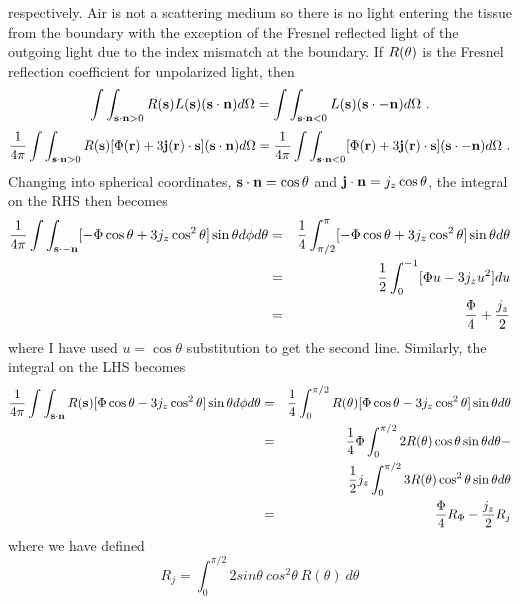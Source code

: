 respectively. Air is not a scattering medium so there is no light entering the tissue from the boundary with the exception of the Fresnel reflected light of the outgoing light due to the index mismatch at the boundary. If $R({\bf \theta})$ is the Fresnel reflection coefficient for unpolarized light, then
\begin{equation}
\label{bc1}
\int\int_{{\bf s} \cdot {\bf n} > 0} R({\bf s}) L({\bf s}) ({\bf s} \cdot {\bf n}) d\Omega =
\int\int_{{\bf s} \cdot {\bf n} < 0} L({\bf s}) ({\bf s} \cdot {- \bf
  n}) d\Omega \ .
\end{equation}
\begin{equation}
\label{bc2}
\frac{1}{4\pi}\int\int_{{\bf s} \cdot {\bf n} > 0} R({\bf s}) [ \Phi({\bf
  r}) + 3 {\bf j}({\bf r}) \cdot {\bf s}] ({\bf s} \cdot {\bf n})
d\Omega = \frac{1}{4\pi} \int\int_{{\bf s} \cdot {\bf n} < 0} [ \Phi({\bf r}) + 3 {\bf j}({\bf
  r}) \cdot {\bf s}] ({\bf s} \cdot {-\bf n}) d\Omega \ .
\end{equation}
Changing into spherical coordinates, ${\bf s}\cdot{\bf
  n}=\cos\theta$ and ${\bf j}\cdot{\bf n}=j_z\cos\theta$, the integral
on the RHS then becomes
\begin{eqnarray}
\label{bc3}
\frac{1}{4\pi}\int\int_{{\bf s} \cdot {-\bf n}} [-\Phi\cos\theta +
3j_z\cos^2\theta]\sin\theta d \phi d\theta &=&
\frac{1}{4}\int_{\pi/2}^{\pi} [-\Phi\cos\theta +
3j_z\cos^2\theta]\sin\theta d\theta \nonumber\\ 
&=&\frac{1}{2}\int_{0}^{-1} [\Phi u - 3j_zu^2] du \nonumber \\
&=&\frac{\Phi}{4}+\frac{j_z}{2}
\end{eqnarray}
\noindent
where I have used $u=\cos\theta$ substitution to get the second line. Similarly, the integral on the LHS becomes 
\begin{eqnarray}
\label{bc4}
\frac{1}{4\pi}\int\int_{{\bf s} \cdot {\bf n}} R({\bf s})[\Phi\cos\theta -
3j_z\cos^2\theta]\sin\theta d \phi d\theta &=&  \frac{1}{4}\int_{0}^{\pi/2}
 R({\bf \theta})[\Phi\cos\theta - 3j_z\cos^2\theta]\sin\theta d\theta \nonumber\\
&=& \frac{1}{4}\Phi\int_{0}^{\pi/2}2R({\bf \theta})\cos\theta\sin\theta
d\theta - \nonumber \\
& & \frac{1}{2} j_z\int_{0}^{\pi/2}3R({\bf \theta})\cos^2\theta\sin\theta d\theta \nonumber \\
&=&\frac{\Phi}{4}R_\Phi-\frac{j_z}{2}R_j
\end{eqnarray}
\noindent
where we have defined
\begin{equation}
\label{Rj}
R_j = \int_0^{\pi/2} 2 sin \theta \ cos^2 \theta \ R(\theta) \ d\theta
\end{equation}
